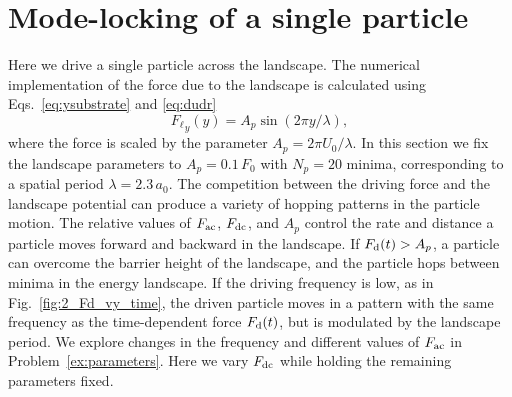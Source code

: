 \documentclass[preprint,showpacs,preprintnumbers,amsmath,amssymb,aps,prb]{revtex4-1}
\theoremstyle{remark}
\begin{document}
\section{Mode-locking of a single particle}

\label{sec:results}
Here we drive 
a single particle 
across the landscape. 
The numerical implementation of the force due to the landscape 
is calculated using Eqs.~\eqref{eq:ysubstrate} and \eqref{eq:dudr}  
\begin{equation}
  \label{eq:force}
  {F_{\ell}}_y(y) = A_{p} \sin{(2 \pi y / \lambda)},
\end{equation}
where the force is scaled by the parameter $A_{p} = 2\pi U_0/\lambda$.
In this section we fix the landscape parameters
to $A_{p} = 0.1\,F_0$ 
with $N_p=20$ minima, 
corresponding to a spatial period $\lambda = 2.3\,a_0$.
The competition between the driving force and the landscape potential
can produce a variety of hopping patterns in the particle motion. 
The relative values of $F_{\rm ac}$, $F_{\rm dc}$, and $A_p$
control the rate and distance a  particle moves 
forward and backward in the landscape.
If $F_{\rm d}(t) > A_p$, a particle can 
overcome the barrier height of the landscape,
and 
the particle hops between minima in the energy landscape.
If the driving frequency is low,
as in Fig.~\ref{fig:2_Fd_vy_time},  
the driven particle 
moves 
in a pattern 
with the same frequency 
as the time-dependent force $F_{\rm d}(t)$,
but is modulated by the landscape period.
We explore changes in the frequency and different values of $F_{\rm ac}$ 
in Problem~\ref{ex:parameters}.
Here we vary $F_{\rm dc}$ 
while holding the remaining parameters fixed.
\end{document}
